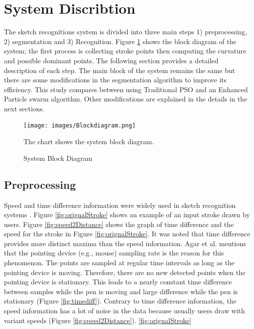 \documentclass[preprint,1p,times,review]{elsarticle}
\begin{document}
\section{System Discribtion  }\label{Sysdisc}
 The sketch recognitions system is divided into three main steps 1) preprocessing, 2) segmentation and 3) Recognition. Figure \ref{fig:flowChart} shows the block diagram of the system; the first process is collecting stroke points then computing the curvature and possible dominant points.  The following section provides a detailed description of each step. The main block of the system remains the same but there are some modifications in the segmentation algorithm to improve its efficiency. This study compares between using Traditional PSO and an Enhanced Particle swarm algorithm. Other modifications are explained in the details in the next sections.

 \begin{figure}
	\centering
		\texttt{[image: images/Blockdiagram.png]}
	\caption{System Block Diagram} The chart shows the system block diagram.
	\label{fig:flowChart}
\end{figure}


\subsection{Preprocessing}
\label{Prepross}
  Speed and time difference information were widely used in sketch recognition systems \cite{earlyprocess}. Figure \ref{fig:orignalStroke} shows an example of an input stroke drawn by users.  Figure \ref{fig:speed2Distance} shows the graph of time difference and the speed for the stroke in Figure \ref{fig:orignalStroke}. It was noted that time difference provides more distinct maxima than the speed information. Agar et al. \cite{polygonfeedback31} mentions that the pointing device (e.g., mouse) sampling rate is the reason for this phenomenon. The points are sampled at regular time intervals as long as the pointing device is moving. Therefore, there are no new detected points when the pointing device is stationary. This leads to a nearly constant time difference between samples while the pen is moving and large difference while the pen is stationary (Figure \ref{fig:timediff}). Contrary to time difference information, the speed information has a lot of noise in the data because usually  users draw with variant speeds (Figure \ref{fig:speed2Distance}).  %
\ref{fig:orignalStroke}
\end{document}
